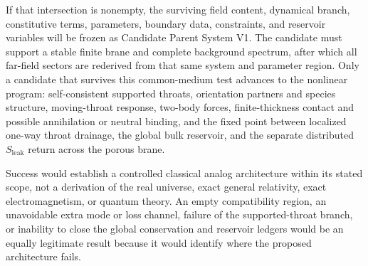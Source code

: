 If that intersection is nonempty, the surviving field content, dynamical
branch, constitutive terms, parameters, boundary data, constraints, and
reservoir variables will be frozen as Candidate Parent System V1. The candidate
must support a stable finite brane and complete background spectrum, after
which all far-field sectors are rederived from that same system and parameter
region. Only a candidate that survives this common-medium test advances to the
nonlinear program: self-consistent supported throats, orientation partners and
species structure, moving-throat response, two-body forces, finite-thickness
contact and possible annihilation or neutral binding, and the fixed point
between localized one-way throat drainage, the global bulk reservoir, and the
separate distributed \(S_{\mathrm{leak}}\) return across the porous brane.

Success would establish a controlled classical analog architecture within its
stated scope, not a derivation of the real universe, exact general relativity,
exact electromagnetism, or quantum theory. An empty compatibility region, an
unavoidable extra mode or loss channel, failure of the supported-throat branch,
or inability to close the global conservation and reservoir ledgers would be an
equally legitimate result because it would identify where the proposed
architecture fails.
